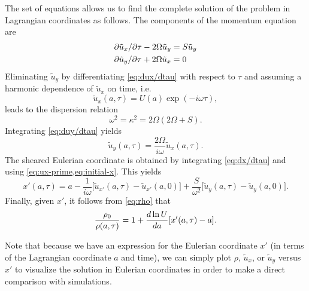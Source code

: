 \documentclass[aps,pre,notitlepage,amsmath,amssymb,amsfonts,nobibnotes,nofootinbib,superscriptaddress,onecolumn,a4paper,10pt]{revtex4-1}
\begin{document}
The set of equations
allows us to find the complete solution of the problem in Lagrangian
coordinates as follows. The components of the momentum equation
 are
\begin{align}
  \label{eq:dux/dtau}
  \partial{\tilde{u}_x}/\partial{\tau} - 2\Omega\tilde{u}_y &= S\tilde{u}_y \\
  \label{eq:duy/dtau}
  \partial{\tilde{u}_y}/\partial{\tau} + 2\Omega\tilde{u}_x &= 0
\end{align}
Eliminating $\tilde{u}_y$ by differentiating \cref{eq:dux/dtau} with respect
to $\tau$ and assuming a harmonic dependence of $\tilde{u}_x$ on time, i.e.
\begin{equation}
  \tilde{u}_x(a,\tau) = U(a)\exp(-i\omega\tau),
\end{equation}
leads to the dispersion relation
\begin{equation}
  \omega^2 = \kappa^2 = 2\Omega(2\Omega + S).
\end{equation}
Integrating \cref{eq:duy/dtau} yields
\begin{equation}
  \tilde{u}_y(a,\tau) = \frac{2\Omega}{i\omega}\tilde{u}_x(a,\tau).
\end{equation}
The sheared Eulerian coordinate is obtained by integrating \cref{eq:dx/dtau}
and using \cref{eq:ux-prime,eq:initial-x}. This yields
\begin{equation}
  x'(a,\tau) =
  a - \frac{1}{i\omega}\Big[\tilde{u}_{x'}(a,\tau) - \tilde{u}_{x'}(a,0)\Big]
  + \frac{S}{\omega^2}\Big[\tilde{u}_y(a,\tau) - \tilde{u}_y(a,0)\Big].
\end{equation}
Finally, given $x'$, it follows from \cref{eq:rho} that
\begin{equation}
  \frac{\rho_0}{\rho(a,\tau)} = 1 + \frac{d\ln U}{da}[x'(a,\tau) - a].
\end{equation}

Note that because we have an expression for the Eulerian coordinate $x'$ (in
terms of the Lagrangian coordinate $a$ and time), we can simply plot $\rho$,
$\tilde{u}_x$, or $\tilde{u}_y$ versus $x'$ to visualize the solution in
Eulerian coordinates in order to make a direct comparison with simulations.


\end{document}
